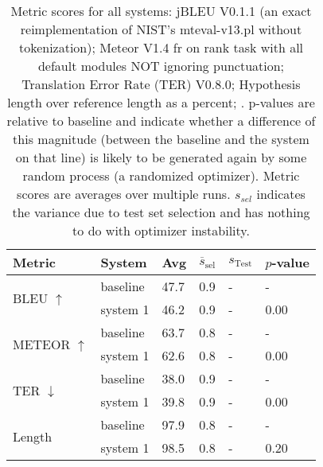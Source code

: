 \begin{table}[htb]
\begin{center}
\begin{footnotesize}
\begin{tabular}{|l|l|l|l|l|l|}
\hline
\bf Metric & \bf System & \bf Avg & \bf $\overline{s}_{\text{sel}}$ & \bf $s_{\text{Test}}$ & \bf $p$-value \\
\hline
\multirow{2}{*}{BLEU $\uparrow$}
& baseline & 47.7 & 0.9 & - & - \\
& system 1 & 46.2 & 0.9 & - & 0.00 \\
\hline
\multirow{2}{*}{METEOR $\uparrow$}
& baseline & 63.7 & 0.8 & - & - \\
& system 1 & 62.6 & 0.8 & - & 0.00 \\
\hline
\multirow{2}{*}{TER $\downarrow$}
& baseline & 38.0 & 0.9 & - & - \\
& system 1 & 39.8 & 0.9 & - & 0.00 \\
\hline
\multirow{2}{*}{Length }
& baseline & 97.9 & 0.8 & - & - \\
& system 1 & 98.5 & 0.8 & - & 0.20 \\
\hline
\end{tabular}
\end{footnotesize}
\end{center}
\caption{\label{tab:scores} Metric scores for all systems: jBLEU V0.1.1 (an exact reimplementation of NIST's mteval-v13.pl without tokenization); Meteor V1.4 fr on rank task with all default modules NOT ignoring punctuation; Translation Error Rate (TER) V0.8.0; Hypothesis length over reference length as a percent; . p-values are relative to baseline and indicate whether a difference of this magnitude (between the baseline and the system on that line) is likely to be generated again by some random process (a randomized optimizer). Metric scores are averages over multiple runs. $s_{sel}$ indicates the variance due to test set selection and has nothing to do with optimizer instability.}
\end{table}
